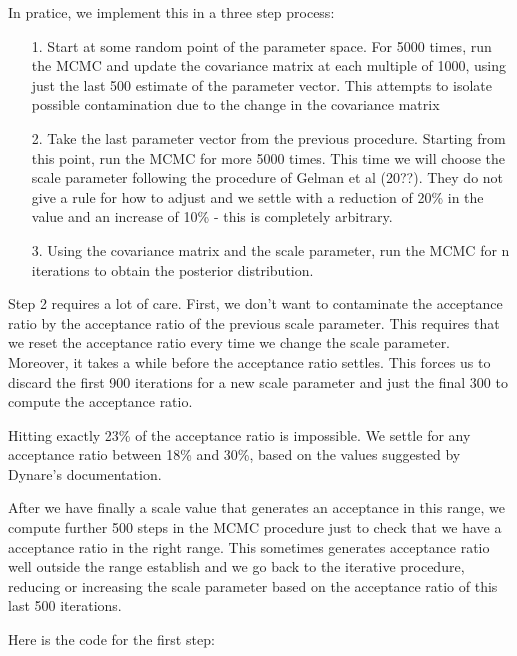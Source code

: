 \documentclass[12pt,a4paper]{article}
\begin{document}
In pratice, we implement this in a three step process:

\begin{itemize}
\item[1. ] Start at some random point of the parameter space. For 5000 times, run the MCMC and update the covariance matrix at each multiple of 1000, using just the last 500 estimate of the parameter vector. This attempts to isolate possible contamination due to the change in the covariance matrix


\item[2. ] Take the last parameter vector from the previous procedure. Starting from this point, run the MCMC for more 5000 times. This time we will choose the scale parameter following the procedure of Gelman et al (20??). They do not give a rule for how to adjust and we settle with a reduction of 20\% in the value and an increase of 10\% - this is completely arbitrary.


\item[3. ] Using the covariance matrix and the scale parameter, run the MCMC for n iterations to obtain the posterior distribution.

\end{itemize}
Step 2 requires a lot of care. First, we don't want to contaminate the acceptance ratio by the acceptance ratio of the previous scale parameter. This requires that we reset the acceptance ratio every time we change the scale parameter. Moreover, it takes a while before the acceptance ratio settles. This forces us to discard the first 900 iterations for a new scale parameter and just the final 300 to compute the acceptance ratio.

Hitting exactly 23\% of the acceptance ratio is impossible. We settle for any acceptance ratio between 18\% and 30\%, based on the values suggested by Dynare's documentation.

After we have finally a scale value that generates an acceptance in this range, we compute further 500 steps in the MCMC procedure just to check that we have a acceptance ratio in the right range. This sometimes generates acceptance ratio well outside the range establish and we go back to the iterative procedure, reducing or increasing the scale parameter based on the acceptance ratio of this last 500 iterations.

Here is the code for the first step:
\end{document}
